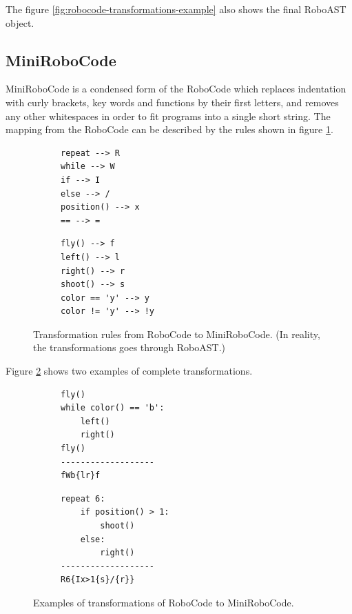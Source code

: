 The figure \ref{fig:robocode-transformations-example} also shows the final RoboAST object.

\subsection{MiniRoboCode}

MiniRoboCode is a condensed form of the RoboCode
which replaces indentation with curly brackets,
key words and functions by their first letters,
and removes any other whitespaces
in order to fit programs into a single short string.
The mapping from the RoboCode can be described by the rules
shown in figure \ref{fig:minirobocode-transformation-rules}.

\begin{figure}[h]
\begin{subfigure}{.49\textwidth}
{\lstset{numbers=none}
\begin{lstlisting}
repeat --> R
while --> W
if --> I
else --> /
position() --> x
== --> =
\end{lstlisting}}
\end{subfigure}
\begin{subfigure}{.49\textwidth}
{\lstset{numbers=none}
\begin{lstlisting}
fly() --> f
left() --> l
right() --> r
shoot() --> s
color == 'y' --> y
color != 'y' --> !y
\end{lstlisting}}
\end{subfigure}
\caption{Transformation rules from RoboCode to MiniRoboCode. (In reality, the transformations goes through RoboAST.)}
\label{fig:minirobocode-transformation-rules}
\end{figure}

Figure \ref{fig:minirobocode-transformations} shows
two examples of complete transformations.
\begin{figure}[h]
\begin{subfigure}{.49\textwidth}
{\lstset{numbers=none}
\begin{lstlisting}
fly()
while color() == 'b':
    left()
    right()
fly()
-------------------
fWb{lr}f
\end{lstlisting}}
\end{subfigure}
\begin{subfigure}{.49\textwidth}
{\lstset{numbers=none}
\begin{lstlisting}
repeat 6:
    if position() > 1:
        shoot()
    else:
        right()
-------------------
R6{Ix>1{s}/{r}}
\end{lstlisting}}
\end{subfigure}
\caption{Examples of transformations of RoboCode to MiniRoboCode.}
\label{fig:minirobocode-transformations}
\end{figure}


